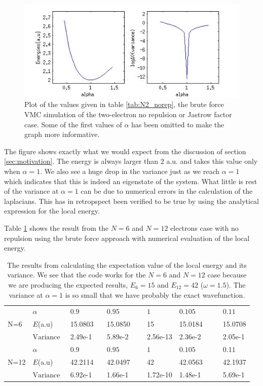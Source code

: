 \begin{figure}[h!]
	\centering 	
	\includegraphics[width=\textwidth]{results/N2_norep.jpg}
	\caption{Plot of the values given in table \ref{tab:N2_norep}, the brute force VMC simulation of the two-electron no repulsion or Jastrow factor case. 
	Some of the first values of $\alpha$ has been omitted to make the graph more informative.}
	\label{fig:N2_norep}
\end{figure}

The figure shows exactly what we would expect from the discussion of section \ref{sec:motivation}. 
The energy is always larger than $2$ a.u. and takes this value only when $\alpha = 1$. 
We also see a huge drop in the variance just as we reach $\alpha = 1$ which indicates that this is indeed an eigenstate of the system.
What little is rest of the variance at $\alpha=1$ can be due to numerical errors in the calculation of the laplacians. 
This has in retropspect been verified to be true by using the analytical expression for the local energy. 

Table \ref{tab:N6_N12_norep} shows the result from the $N=6$ and $N=12$ electrons case with no repulsion using the brute force approach with numerical evaluation of the local energy.

\begin{table}[h!]
	\centering 
	\begin{tabular}{l @{}l @{ } l @{ } l @{ } l @{ } l @{ } l}
		\toprule
		\multirow{3}{*}{N=6}$~~\quad ~~$ & $\alpha~~~~$ & $0.9~~~~~~~~~~~~~$ & $0.95~~~~~~~~~~~~~$ & $1~~~~~~~~~~~~~$ & $0.105~~~~~~~~~~~~~$  & $0.11$ \\
		 & $E$(a.u) & 15.0803 & 15.0850 & 15 & 15.0184 & 15.0708\\ 
		 & $\textrm{Variance} ~~$ & 2.49e-1 & 5.89e-2 & 2.56e-13 & 2.36e-2 & 2.05e-1\\ 
		\midrule
		\multirow{3}{*}{N=12} & $\alpha~~~~$ & $0.9~~~~$ & $0.95~~~~$ & $1~~~~$ & $0.105~~~~$  & $0.11$ \\
		& $E$(a.u) & 42.2114 & 42.0497 & 42 & 42.0563 & 42.1937 \\ 
		& $\textrm{Variance} ~~$ & 6.92e-1 & 1.66e-1 & 1.72e-10 & 1.48e-1 & 5.69e-1\\ 
		\bottomrule
	\end{tabular}
	\caption{The results from calculating the expectation value of the local energy and its variance.
			We see that the code works for the $N=6$ and $N=12$ case because we are producing the expected results, $E_6 = 15$ and $E_{12} = 42$ ($\omega = 1.5$). 
			The variance at $\alpha=1$ is so small that we have probably the exact wavefunction.}
	\label{tab:N6_N12_norep}
\end{table}

